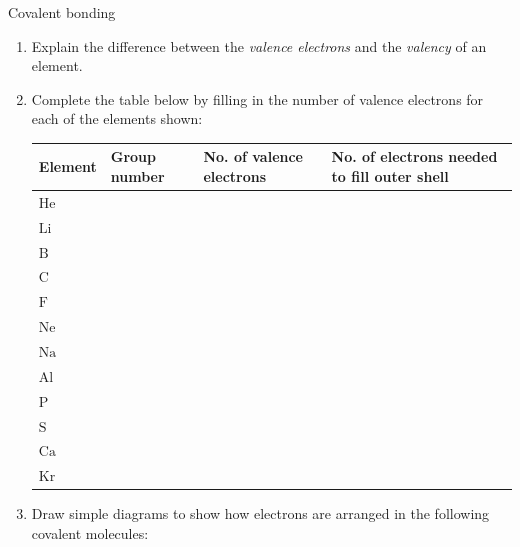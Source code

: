             \begin{exercises}{Covalent bonding
        }
            \nopagebreak \noindent
        \label{m38704*id139588}\begin{enumerate}[noitemsep, label=\textbf{\arabic*}. ] 
            \label{m38704*uid10}\item Explain the difference between the \textsl{valence electrons} and the \textsl{valency} of an element.\newline
\label{m38704*uid11}\item Complete the table below by filling in the number of valence electrons for each of the elements shown:
          \begin{table}[H]
        \begin{center}
      \label{m38704*id139625}
    \noindent
      \begin{tabular}{|l|l|p{3cm}|p{3cm}|}\hline
\textbf{Element} & \textbf{Group number} & \textbf{No. of valence electrons} & \textbf{No. of electrons needed to fill outer shell}  \\ \hline
        $\text{He}$ & & & \\ \hline
        $\text{Li}$ & & & \\ \hline
        $\text{B}$ & & & \\ \hline
        $\text{C}$ & & & \\ \hline
        $\text{F}$ & & & \\ \hline
        $\text{Ne}$ & & & \\ \hline
        $\text{Na}$ & & & \\ \hline
        $\text{Al}$ & & & \\ \hline
        $\text{P}$ & & & \\ \hline
        $\text{S}$ & & & \\ \hline
        $\text{Ca}$ & & & \\ \hline
        $\text{Kr}$ & & & \\ \hline
    \end{tabular}
      \end{center}
\end{table}
    \par
          \label{m38704*uid12}\item Draw simple diagrams to show how electrons are arranged in the following covalent molecules:

\end{enumerate}
\end{exercises}
